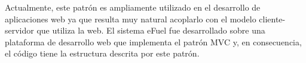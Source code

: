     Actualmente, este patrón es ampliamente utilizado en el desarrollo de aplicaciones web ya que resulta muy natural acoplarlo con el modelo cliente-servidor que utiliza la web. El sistema eFuel fue desarrollado sobre una plataforma de desarrollo web que implementa el patrón MVC y, en consecuencia, el código tiene la estructura descrita por este patrón.